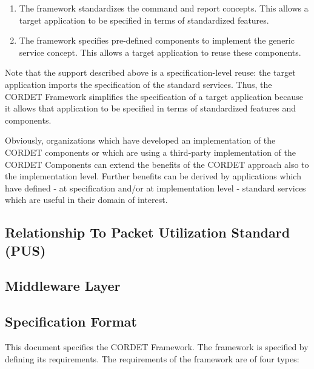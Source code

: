 \documentclass{pnp_article}
\begin{document}
\begin{enumerate}
\item{} The framework standardizes the command and report concepts. 
This allows a target application to be specified in terms of standardized features.  
\item{} The framework specifies pre-defined components to implement the generic service concept. 
This allows a target application to reuse these components.  
\end{enumerate}

Note that the support described above is a specification-level reuse: the target application imports the specification of the standard services. 
Thus, the CORDET Framework simplifies the specification of a target application because it allows that application to be specified in terms of standardized features and components.

Obviously, organizations which have developed an implementation of the CORDET components or which are using a third-party implementation of the CORDET Components can extend the benefits of the CORDET approach also to the implementation level. Further benefits can be derived by applications which have defined - at specification and/or at implementation level - standard services which are useful in their domain of interest.

\subsection{Relationship To Packet Utilization Standard (PUS)}\label{sec:RelationshipToPUS}


\subsection{Middleware Layer}\label{sec:MwLayer} 


\subsection{Specification Format}\label{sec:SpecFormat} 

This document specifies the CORDET Framework. 
The framework is specified by defining its requirements. 
The requirements of the framework are of four types:
\end{document}
